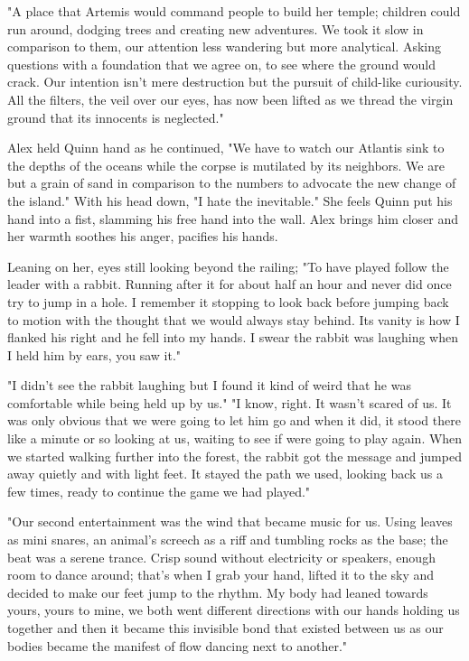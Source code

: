 \begin{Document}
            "A place that Artemis would command people to build her temple; children could run around, dodging trees and creating new adventures. We took it slow
        in comparison to them, our attention less wandering but more analytical. Asking questions with a foundation that we agree on, to see where the ground would
        crack. Our intention isn't mere destruction but the pursuit of child-like curiousity. All the filters, the veil over our eyes, has now been lifted as
        we thread the virgin ground that its innocents is neglected."

            Alex held Quinn hand as he continued, "We have to watch our Atlantis sink to the depths of the oceans while the corpse is mutilated by its neighbors.
        We are but a grain of sand in comparison to the numbers to advocate the new change of the island." With his head down, "I hate the inevitable." She
        feels Quinn put his hand into a fist, slamming his free hand into the wall. Alex brings him closer and her warmth soothes his anger, pacifies his
        hands.

           Leaning on her, eyes still looking beyond the railing; "To have played follow the leader with a rabbit. Running after it for about half an hour and
        never did once try to jump in a hole. I remember it stopping to look back before jumping back to motion with the thought that we would always stay behind.
        Its vanity is how I flanked his right and he fell into my hands. I swear the rabbit was laughing when I held him by ears, you saw it."

            "I didn't see the rabbit laughing but I found it kind of weird that he was comfortable while being held up by us." "I know, right. It wasn't scared
        of us. It was only obvious that we were going to let him go and when it did, it stood there like a minute or so looking at us, waiting to see if were
        going to play again. When we started walking further into the forest, the rabbit got the message and jumped away quietly and with light feet. It stayed
        the path we used, looking back us a few times, ready to continue the game we had played."

            "Our second entertainment was the wind that became music for us. Using leaves as mini snares, an animal's screech as a riff and tumbling rocks as the
        base; the beat was a serene trance. Crisp sound without electricity or speakers, enough room to dance around; that's when I grab your hand, lifted it
        to the sky and decided to make our feet jump to the rhythm. My body had leaned towards yours, yours to mine, we both went different directions with
        our hands holding us together and then it became this invisible bond that existed between us as our bodies became the manifest of flow dancing next to
        another."


\end{Document}
